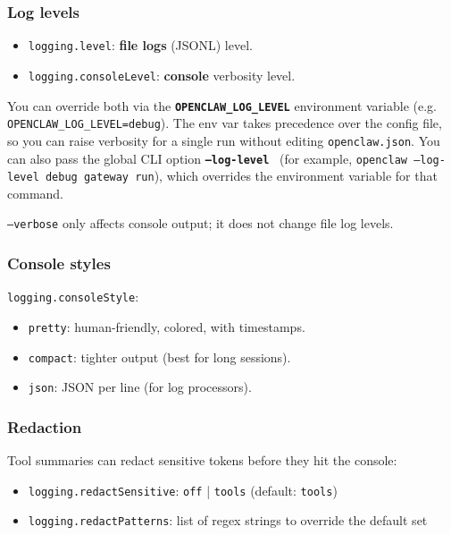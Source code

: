 \subsubsection{Log levels}


\begin{itemize}
  \item \texttt{logging.level}: \textbf{file logs} (JSONL) level.
  \item \texttt{logging.consoleLevel}: \textbf{console} verbosity level.
\end{itemize}


You can override both via the \textbf{\texttt{OPENCLAW\_LOG\_LEVEL}} environment variable (e.g. \texttt{OPENCLAW\_LOG\_LEVEL=debug}). The env var takes precedence over the config file, so you can raise verbosity for a single run without editing \texttt{openclaw.json}. You can also pass the global CLI option \textbf{\texttt{--log-level }} (for example, \texttt{openclaw --log-level debug gateway run}), which overrides the environment variable for that command.

\texttt{--verbose} only affects console output; it does not change file log levels.

\subsubsection{Console styles}


\texttt{logging.consoleStyle}:

\begin{itemize}
  \item \texttt{pretty}: human-friendly, colored, with timestamps.
  \item \texttt{compact}: tighter output (best for long sessions).
  \item \texttt{json}: JSON per line (for log processors).
\end{itemize}


\subsubsection{Redaction}


Tool summaries can redact sensitive tokens before they hit the console:

\begin{itemize}
  \item \texttt{logging.redactSensitive}: \texttt{off} | \texttt{tools} (default: \texttt{tools})
  \item \texttt{logging.redactPatterns}: list of regex strings to override the default set
\end{itemize}


